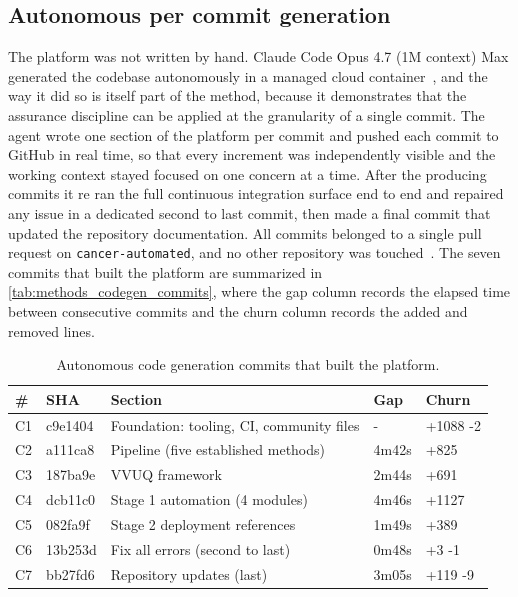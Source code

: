 \subsection{Autonomous per commit generation}

The platform was not written by hand. Claude Code Opus 4.7 (1M context) Max
generated the codebase autonomously in a managed cloud
container~\cite{anthropicopus47, anthropicclaudecodeweb}, and the way it did so
is itself part of the method, because it demonstrates that the assurance
discipline can be applied at the granularity of a single commit. The agent wrote
one section of the platform per commit and pushed each commit to GitHub in real
time, so that every increment was independently visible and the working context
stayed focused on one concern at a time. After the producing commits it re ran
the full continuous integration surface end to end and repaired any issue in a
dedicated second to last commit, then made a final commit that updated the
repository documentation. All commits belonged to a single pull request on
\texttt{cancer-automated}, and no other repository was touched~\cite{repo-cancer-automated}.
The seven commits that built the platform are summarized in
\autoref{tab:methods_codegen_commits}, where the gap column records the elapsed
time between consecutive commits and the churn column records the added and
removed lines.

\begin{table}[H]
\caption{Autonomous code generation commits that built the platform.}
\label{tab:methods_codegen_commits}
\centering
\begin{tabularx}{\textwidth}{C{0.7cm} L{2.0cm} >{\raggedright\arraybackslash}X C{1.6cm} C{2.0cm}}
\toprule
\textbf{\#} & \textbf{SHA} & \textbf{Section} & \textbf{Gap} & \textbf{Churn} \\
\midrule
  C1 & c9e1404 & Foundation: tooling, CI, community files & - & +1088 -2 \\
  C2 & a111ca8 & Pipeline (five established methods) & 4m42s & +825 \\
  C3 & 187ba9e & VVUQ framework & 2m44s & +691 \\
  C4 & dcb11c0 & Stage 1 automation (4 modules) & 4m46s & +1127 \\
  C5 & 082fa9f & Stage 2 deployment references & 1m49s & +389 \\
  C6 & 13b253d & Fix all errors (second to last) & 0m48s & +3 -1 \\
  C7 & bb27fd6 & Repository updates (last) & 3m05s & +119 -9 \\
\bottomrule
\end{tabularx}
\end{table}

